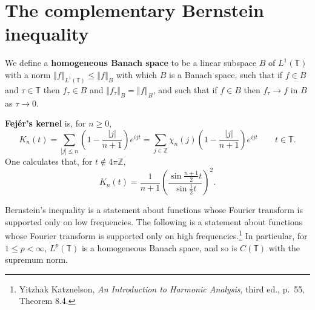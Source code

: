 \documentclass{article}
\newcommand{\norm}[1]{\left\Vert #1 \right\Vert}
\theoremstyle{definition}
\theoremstyle{definition}
\begin{document}
\section{The complementary Bernstein inequality}
We define a \textbf{homogeneous Banach space} to be a linear subspace $B$
of $L^1(\mathbb{T})$ with a norm $\norm{f}_{L^1(\mathbb{T})} \leq
\norm{f}_B$ with which $B$ is a Banach space,
such that if $f \in B$ and $\tau \in \mathbb{T}$ then $f_\tau \in B$ and $\norm{f_\tau}_B = \norm{f}_B$,
and such that if $f \in B$ then $f_\tau \to f$ in $B$ as $\tau \to 0$. 

 \textbf{Fej\'er's kernel} is, for $n \geq 0$,
\[
K_n(t) = \sum_{|j| \leq n} \left(1-\frac{|j|}{n+1} \right) e^{ijt}=
\sum_{j \in \mathbb{Z}} \chi_n(j) \left(1-\frac{|j|}{n+1} \right) e^{ijt} \qquad t \in \mathbb{T}.
\]
One calculates that, for $t \not \in 4\pi \mathbb{Z}$,
\[
K_n(t) = \frac{1}{n+1} \left( \frac{\sin \frac{n+1}{2}t}{\sin \frac{1}{2}t} \right)^2.
\]

Bernstein's inequality is a statement about functions whose Fourier transform is supported only on low frequencies. The following is a statement
about functions whose Fourier transform is supported only on high frequencies.\footnote{Yitzhak Katznelson, {\em An Introduction to Harmonic
Analysis}, third ed., p.~55, Theorem 8.4.} In particular, for $1 \leq p < \infty$, $L^p(\mathbb{T})$ is a homogeneous Banach space, and
so is $C(\mathbb{T})$ with the supremum norm.
\end{document}
